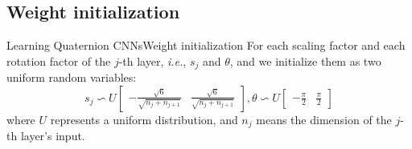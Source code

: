 \documentclass{beamer}
\begin{document}
\subsection{Weight initialization}
\begin{frame}{Learning Quaternion CNNs}{Weight initialization}
For each scaling factor and each rotation factor of the $j$-th layer,
\emph{i.e.}, $s_j$ and $\theta$, and we initialize them as two uniform random variables:
\begin{equation}
    s_j \backsim U
    \begin{bmatrix}
        -\frac{\sqrt{6}}
        {\sqrt{n_j+n_{j+1}}}& \frac{\sqrt{6}}{\sqrt{n_j+n_{j+1}}}
    \end{bmatrix}
    ,
    \theta\backsim U
    \begin{bmatrix}
        -\frac{\pi}{2}&\frac{\pi}{2}
    \end{bmatrix}
\end{equation}
where $U$ represents a uniform distribution, and $n_j$ means the dimension of the
$j$-th layer's input.
\end{frame}
\end{document}
